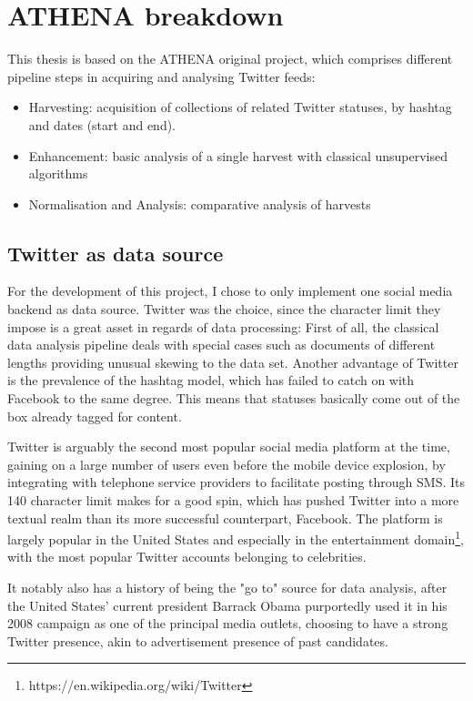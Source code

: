 \documentclass[12pt,a4paper,twoside]{report}
\begin{document}
\section{ATHENA breakdown}
This thesis is based on the ATHENA original project, which comprises different pipeline steps in acquiring and analysing Twitter feeds:

\begin{itemize}
\item Harvesting: acquisition of collections of related Twitter statuses, by hashtag and dates (start and end).
\item Enhancement: basic analysis of a single harvest with classical unsupervised algorithms
\item Normalisation and Analysis: comparative analysis of harvests
\end{itemize}

\subsection{Twitter as data source}
For the development of this project, I chose to only implement one social media backend as data source. Twitter was the choice, since the character limit they impose is a great asset in regards of data processing: First of all, the classical data analysis pipeline deals with special cases such as documents of different lengths providing unusual skewing to the data set. Another advantage of Twitter is the prevalence of the hashtag model, which has failed to catch on with Facebook to the same degree. This means that statuses basically come out of the box already tagged for content.

Twitter is arguably the second most popular social media platform at the time, gaining on a large number of users even before the mobile device explosion, by integrating with telephone service providers to facilitate posting through SMS. Its 140 character limit makes for a good spin, which has pushed Twitter into a more textual realm than its more successful counterpart, Facebook. The platform is largely popular in the United States and especially in the entertainment domain\footnote{https://en.wikipedia.org/wiki/Twitter}, with the most popular Twitter accounts belonging to celebrities.

It notably also has a history of being the "go to" source for data analysis, after the United States' current president Barrack Obama purportedly used it in his 2008 campaign as one of the principal media outlets, choosing to have a strong Twitter presence, akin to advertisement presence of past candidates.
\end{document}
